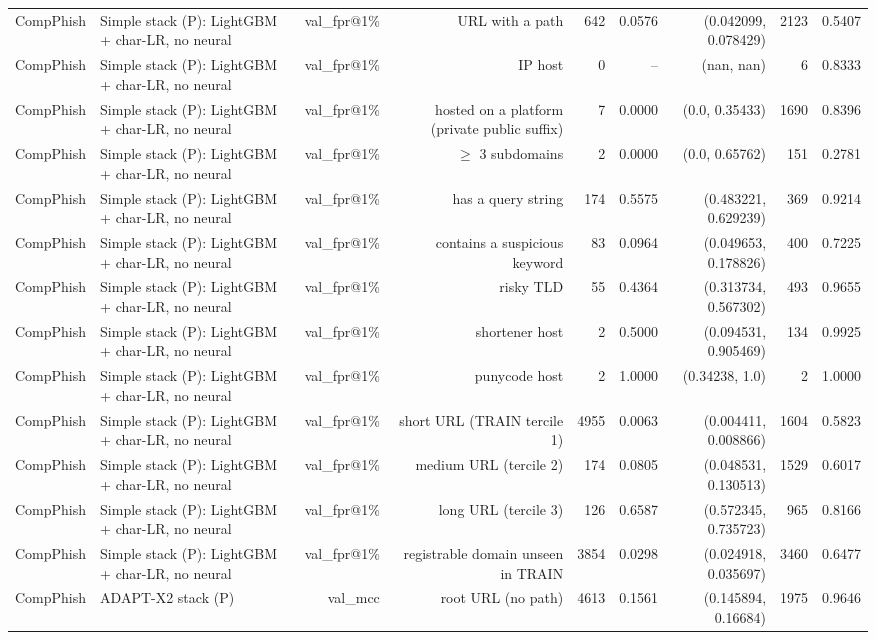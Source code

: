 \begin{table}[t]
\begin{tabular}{llrrrrrrr}
CompPhish & Simple stack (P): LightGBM + char-LR, no neural & val\_fpr@1\% & URL with a path & 642 & 0.0576 & (0.042099, 0.078429) & 2123 & 0.5407 \\
CompPhish & Simple stack (P): LightGBM + char-LR, no neural & val\_fpr@1\% & IP host & 0 & -- & (nan, nan) & 6 & 0.8333 \\
CompPhish & Simple stack (P): LightGBM + char-LR, no neural & val\_fpr@1\% & hosted on a platform (private public suffix) & 7 & 0.0000 & (0.0, 0.35433) & 1690 & 0.8396 \\
CompPhish & Simple stack (P): LightGBM + char-LR, no neural & val\_fpr@1\% & $\geq$ 3 subdomains & 2 & 0.0000 & (0.0, 0.65762) & 151 & 0.2781 \\
CompPhish & Simple stack (P): LightGBM + char-LR, no neural & val\_fpr@1\% & has a query string & 174 & 0.5575 & (0.483221, 0.629239) & 369 & 0.9214 \\
CompPhish & Simple stack (P): LightGBM + char-LR, no neural & val\_fpr@1\% & contains a suspicious keyword & 83 & 0.0964 & (0.049653, 0.178826) & 400 & 0.7225 \\
CompPhish & Simple stack (P): LightGBM + char-LR, no neural & val\_fpr@1\% & risky TLD & 55 & 0.4364 & (0.313734, 0.567302) & 493 & 0.9655 \\
CompPhish & Simple stack (P): LightGBM + char-LR, no neural & val\_fpr@1\% & shortener host & 2 & 0.5000 & (0.094531, 0.905469) & 134 & 0.9925 \\
CompPhish & Simple stack (P): LightGBM + char-LR, no neural & val\_fpr@1\% & punycode host & 2 & 1.0000 & (0.34238, 1.0) & 2 & 1.0000 \\
CompPhish & Simple stack (P): LightGBM + char-LR, no neural & val\_fpr@1\% & short URL (TRAIN tercile 1) & 4955 & 0.0063 & (0.004411, 0.008866) & 1604 & 0.5823 \\
CompPhish & Simple stack (P): LightGBM + char-LR, no neural & val\_fpr@1\% & medium URL (tercile 2) & 174 & 0.0805 & (0.048531, 0.130513) & 1529 & 0.6017 \\
CompPhish & Simple stack (P): LightGBM + char-LR, no neural & val\_fpr@1\% & long URL (tercile 3) & 126 & 0.6587 & (0.572345, 0.735723) & 965 & 0.8166 \\
CompPhish & Simple stack (P): LightGBM + char-LR, no neural & val\_fpr@1\% & registrable domain unseen in TRAIN & 3854 & 0.0298 & (0.024918, 0.035697) & 3460 & 0.6477 \\
CompPhish & ADAPT-X2 stack (P) & val\_mcc & root URL (no path) & 4613 & 0.1561 & (0.145894, 0.16684) & 1975 & 0.9646 \\

\end{tabular}
\end{table}
